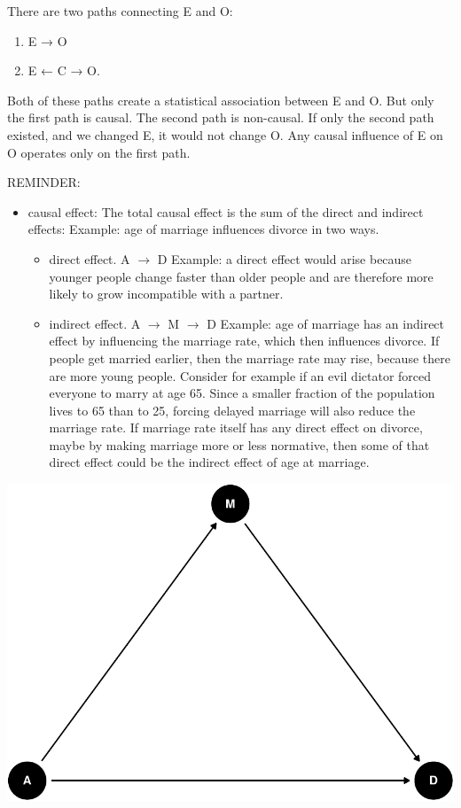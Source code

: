 \documentclass[
]{article}
\begin{document}
There are two paths connecting E and O:

\begin{enumerate}
\def\labelenumi{(\arabic{enumi})}
\item
  E → O
\item
  E ← C → O.
\end{enumerate}

Both of these paths create a statistical association between E and O.
But only the first path is causal. The second path is non-causal. If
only the second path existed, and we changed E, it would not change O.
Any causal influence of E on O operates only on the first path.

REMINDER:

\begin{itemize}
\item
  causal effect: The total causal effect is the sum of the direct and
  indirect effects: Example: age of marriage influences divorce in two
  ways.

  \begin{itemize}
  \item
    direct effect. A \(\to\) D Example: a direct effect would arise
    because younger people change faster than older people and are
    therefore more likely to grow incompatible with a partner.
  \item
    indirect effect. A \(\to\) M \(\to\) D Example: age of marriage has
    an indirect effect by influencing the marriage rate, which then
    influences divorce. If people get married earlier, then the marriage
    rate may rise, because there are more young people. Consider for
    example if an evil dictator forced everyone to marry at age 65.
    Since a smaller fraction of the population lives to 65 than to 25,
    forcing delayed marriage will also reduce the marriage rate. If
    marriage rate itself has any direct effect on divorce, maybe by
    making marriage more or less normative, then some of that direct
    effect could be the indirect effect of age at marriage.
  \end{itemize}
\end{itemize}

\includegraphics{index_files/figure-latex/dag1.3 ex1-1.pdf}
\end{document}
